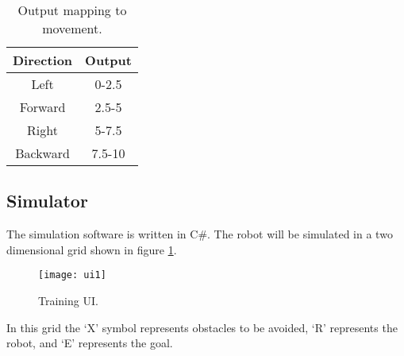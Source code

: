 \begin{table}
\centering
	\begin{tabular}{|c|c|}
	\hline
	Direction & Output\\
	\hline
	Left & 0-2.5\\
	\hline
	Forward & 2.5-5\\
	\hline
	Right & 5-7.5\\
	\hline
	Backward & 7.5-10\\
	\hline
	\end{tabular}
	\caption{Output mapping to movement.}
	\label{tab:outputdirectoin}
\end{table}
\subsection{Simulator}
The simulation software is written in C\#. The robot will be simulated in a two dimensional grid shown in figure \ref{fig:trainingUI}. 

\begin{figure}[h]
	\centering
	\texttt{[image: ui1]}
	\caption{Training UI.}
	\label{fig:trainingUI}
\end{figure}

In this grid the `X' symbol represents obstacles to be avoided, `R' represents the robot, and `E' represents the goal.